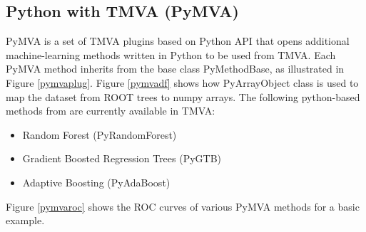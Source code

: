 \documentclass[a4paper]{jpconf}
\begin{document}
\clearpage
\subsection{Python with TMVA (PyMVA)} \label{PYMVA}
PyMVA is a set of TMVA plugins based on Python API that opens additional machine-learning methods written in Python to be used from TMVA. Each PyMVA method inherits from the base class PyMethodBase, as illustrated in Figure \ref{pymvaplug}. Figure \ref{pymvadf} shows how PyArrayObject class is used to map the dataset from ROOT trees to numpy arrays. The following python-based methods from \cite{pedregosa2011scikit} are currently available in TMVA:


\begin{itemize}
\item Random Forest (PyRandomForest)
\item Gradient Boosted Regression Trees (PyGTB) 
\item Adaptive Boosting (PyAdaBoost) 
\end{itemize}
Figure \ref{pymvaroc} shows the ROC curves of various PyMVA methods for a basic example.
\end{document}
